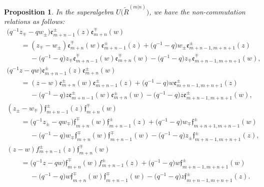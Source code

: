 \documentclass[pdftex]{sigma}
\numberwithin{equation}{section}
\newtheorem{Proposition}[Theorem]{Proposition}
 { \theoremstyle{definition}
\newtheorem{Definition}[Theorem]{Definition}
\newtheorem{Note}[Theorem]{Note}
\newtheorem{Example}[Theorem]{Example}
\newtheorem{Remark}[Theorem]{Remark} }
\begin{document}
\begin{Proposition}In the superalgebra $U\bigl(\widetilde{R}^{(m|n)}\bigr)$, we have the non-commutation relations as follows:
\begin{gather*}
 \bigl(q^{-1}z_{\mp} -qw_{\pm}\bigr)\mathfrak{e}_{m+n-1}^{\pm}(z)\mathfrak{e}_{m+n}^{\mp}(w)\\
 \qquad=(z_{\mp}-w_{\pm})\mathfrak{e}_{m+n}^{\mp}(w)\mathfrak{e}_{m+n-1}^{\pm}(z)
+\bigl(q^{-1}-q\bigr)w_{\pm} \mathfrak{e}_{m+n-1,m+n+1}^{\pm}(z)\\
\phantom{ \qquad=}{}- \bigl(q^{-1}-q\bigr)z_{\mp}\mathfrak{e}_{m+n-1}^{\mp}(w)\mathfrak{e}_{m+n}^{\mp}(w)-\bigl(q^{-1}-q\bigr)z_{\mp}\mathfrak{e}_{m+n-1,m+n+1}^{\mp}(w),
\\
 \bigl(q^{-1}z- qw\bigr)\mathfrak{e}_{m+n-1}^{\pm}(z)\mathfrak{e}_{m+n}^{\pm}(w)\\
 \qquad=(z-w)\mathfrak{e}_{m+n}^{\pm}(w)\mathfrak{e}_{m+n-1}^{\pm}(z)
+\bigl(q^{-1}-q\bigr)w\mathfrak{e}_{m+n-1,m+n+1}^{\pm}(z)
\\
\phantom{ \qquad=}{}-\bigl(q^{-1}-q\bigr)z\mathfrak{e}_{m+n-1}^{\pm}(w)\mathfrak{e}_{m+n}^{\pm}(w)-\bigl(q^{-1}-q\bigr)z\mathfrak{e}_{m+n-1,m+n+1}^{\pm}(w),
\\
 (z_{\pm}-w_{\mp} )\mathfrak{f}_{m+n-1}^{\pm}(z)\mathfrak{f}_{m+n}^{\mp}(w)\\
 \qquad=\bigl(q^{-1}z_{\pm}-qw_{\mp}\bigr)\mathfrak{f}_{m+n}^{\mp}(w)\mathfrak{f}_{m+n-1}^{\pm}(z)
+\bigl(q^{-1}-q\bigr)w_{\mp}\mathfrak{f}_{m+n+1,m+n-1}^{\pm}(w)\\
\phantom{ \qquad=}{}-\bigl(q^{-1}-q\bigr)w_{\mp}\mathfrak{f}_{m+n}^{\mp}(w)\mathfrak{f}_{m+n-1}^{\mp}(w) -\bigl(q^{-1}-q\bigr)z_{\pm}\mathfrak{f}_{m+n-1,m+n+1}^{\pm}(z),
\\
 (z-w) f_{m+n-1}^{\pm}(z)\mathfrak{f}_{m+n}^{\mp}(w)\\
\qquad =\bigl(q^{-1}z-qw\bigr)\mathfrak{f}_{m+n}^{\mp}(w)f_{m+n-1}^{\pm}(z)
+\bigl(q^{-1}-q\bigr)w\mathfrak{f}_{m+n-1,m+n+1}^{\pm}(w)
\\
 \phantom{ \qquad=}{}-\bigl(q^{-1}-q\bigr)w\mathfrak{f}_{m+n}^{\mp}(w)\mathfrak{f}_{m+n-1}^{\mp}(w)-\bigl(q^{-1}-q\bigr)z\mathfrak{f}_{m+n-1,m+n+1}^{\pm}(z).
\end{gather*}
\end{Proposition}
\end{document}

